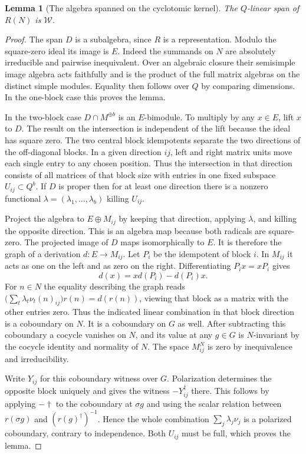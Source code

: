 \documentclass[a4paper,11pt]{article}
\newtheorem{lemma}[proposition]{Lemma}
\theoremstyle{definition}
\theoremstyle{remark}
\numberwithin{equation}{section}
\begin{document}
\begin{lemma}[The algebra spanned on the cyclotomic kernel]
\label{lem:spandual367}
The \(Q\)-linear span of \(R(N)\) is \(\mathcal W\).
\end{lemma}
\begin{proof}
The span \(D\) is a subalgebra, since \(R\) is a representation.
Modulo the square-zero ideal its image is \(E\). Indeed the
summands on \(N\) are absolutely irreducible and pairwise
inequivalent. Over an algebraic closure their semisimple
image algebra acts faithfully and is the product of the
full matrix algebras on the distinct simple modules. Equality
then follows over \(Q\) by comparing dimensions. In the
one-block case this proves the lemma.

In the two-block case \(D\cap M^{\oplus b}\) is an \(E\)-bimodule.
To multiply by any \(x\in E\), lift \(x\) to \(D\). The result
on the intersection is independent of the lift because the
ideal has square zero. The two central block idempotents
separate the two directions of the off-diagonal blocks.
In a given direction \(ij\), left and right matrix units
move each single entry to any chosen position. Thus the
intersection in that direction consists of all matrices
of that block size with entries in one fixed subspace
\(U_{ij}\subset Q^b\). If \(D\) is proper then for at least
one direction there is a nonzero functional
\(\lambda=(\lambda_1,\ldots,\lambda_b)\) killing \(U_{ij}\).

Project the algebra to \(E\oplus M_{ij}\) by keeping that
direction, applying \(\lambda\), and killing the opposite
direction. This is an algebra map because both radicals
are square-zero. The projected image of \(D\) maps
isomorphically to \(E\). It is therefore the graph of a
derivation \(d:E\to M_{ij}\). Let \(P_i\) be the idempotent
of block \(i\). In \(M_{ij}\) it acts as one on the left
and as zero on the right. Differentiating \(P_i x=xP_i\)
gives
\[
                     d(x)=x d(P_i)-d(P_i)x .
\]
For \(n\in N\) the equality describing the graph reads
\(\big(\sum_t\lambda_t\nu_t(n)_{ij}\big)r(n)=d(r(n))\),
viewing that block as a matrix with the other entries zero.
Thus the indicated
linear combination in that block direction is a coboundary
on \(N\). It is a coboundary on \(G\) as well. After subtracting
this coboundary a cocycle vanishes on \(N\), and its value
at any \(g\in G\) is \(N\)-invariant by the cocycle identity
and normality of \(N\). The space \(M_{ij}^N\) is zero by
inequivalence and irreducibility.

Write \(Y_{ij}\) for this coboundary witness over \(G\).
Polarization determines the opposite block uniquely and
gives the witness \(-Y_{ij}^\dagger\) there. This follows
by applying \(-\dagger\) to the coboundary at \(\sigma g\)
and using the scalar relation between \(r(\sigma g)\)
and \((r(g)^\dagger)^{-1}\). Hence the whole combination
\(\sum_j\lambda_j\nu_j\) is a polarized coboundary, contrary
to independence. Both \(U_{ij}\) must be full, which proves
the lemma.
\end{proof}
\end{document}
